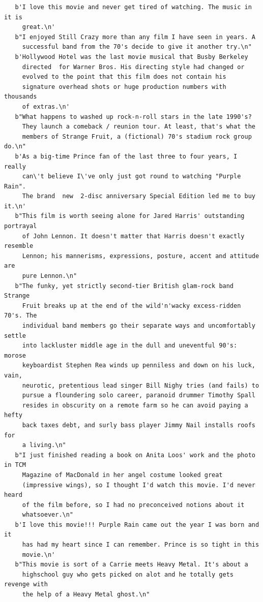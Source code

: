 \begin{lstlisting}
   b'I love this movie and never get tired of watching. The music in it is 
     great.\n'
   b"I enjoyed Still Crazy more than any film I have seen in years. A 
     successful band from the 70's decide to give it another try.\n"
   b'Hollywood Hotel was the last movie musical that Busby Berkeley 
     directed  for Warner Bros. His directing style had changed or
     evolved to the point that this film does not contain his 
     signature overhead shots or huge production numbers with thousands 
     of extras.\n'
   b"What happens to washed up rock-n-roll stars in the late 1990's?
     They launch a comeback / reunion tour. At least, that's what the
     members of Strange Fruit, a (fictional) 70's stadium rock group do.\n"
   b'As a big-time Prince fan of the last three to four years, I really 
     can\'t believe I\'ve only just got round to watching "Purple Rain". 
     The brand  new  2-disc anniversary Special Edition led me to buy it.\n'
   b"This film is worth seeing alone for Jared Harris' outstanding portrayal
     of John Lennon. It doesn't matter that Harris doesn't exactly resemble
     Lennon; his mannerisms, expressions, posture, accent and attitude are
     pure Lennon.\n"
   b"The funky, yet strictly second-tier British glam-rock band Strange 
     Fruit breaks up at the end of the wild'n'wacky excess-ridden 70's. The 
     individual band members go their separate ways and uncomfortably settle
     into lackluster middle age in the dull and uneventful 90's: morose 
     keyboardist Stephen Rea winds up penniless and down on his luck, vain, 
     neurotic, pretentious lead singer Bill Nighy tries (and fails) to
     pursue a floundering solo career, paranoid drummer Timothy Spall 
     resides in obscurity on a remote farm so he can avoid paying a hefty 
     back taxes debt, and surly bass player Jimmy Nail installs roofs for 
     a living.\n"
   b"I just finished reading a book on Anita Loos' work and the photo in TCM
     Magazine of MacDonald in her angel costume looked great 
     (impressive wings), so I thought I'd watch this movie. I'd never heard 
     of the film before, so I had no preconceived notions about it 
     whatsoever.\n"
   b'I love this movie!!! Purple Rain came out the year I was born and it
     has had my heart since I can remember. Prince is so tight in this 
     movie.\n'
   b"This movie is sort of a Carrie meets Heavy Metal. It's about a 
     highschool guy who gets picked on alot and he totally gets revenge with
     the help of a Heavy Metal ghost.\n"

\end{lstlisting}


